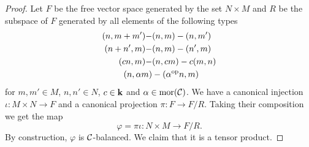 \begin{proof}
    Let $F$ be the free vector space generated by the set $N\times M$ and $R$ be the subspace of $F$ generated by all elements of the following types
    \begin{align*}
        (n,m+m')-&(n,m)-(n, m')\\
        (n+n', m)-&(n,m)-(n',m)\\
        (cn, m)-&(n, cm)-c(m,n)\\
        \left(n,\alpha m\right)&-\left(\alpha^{\text{op}}n, m\right)
    \end{align*}
    for $m,m'\in M$, $n,n'\in N$, $c\in\mathbf{k}$ and $\alpha\in\operatorname{mor}(\mathcal{C})$.
    We have a canonical injection $\iota\colon M\times N\to F$ and a canonical projection $\pi\colon F\to F/R$.
    Taking their composition we get the map
    \[ \varphi=\pi\iota\colon N\times M\to F/R. \]
    By construction, $\varphi$ is $\mathcal{C}$-balanced. 
    We claim that it is a tensor product.
    

\end{proof}
